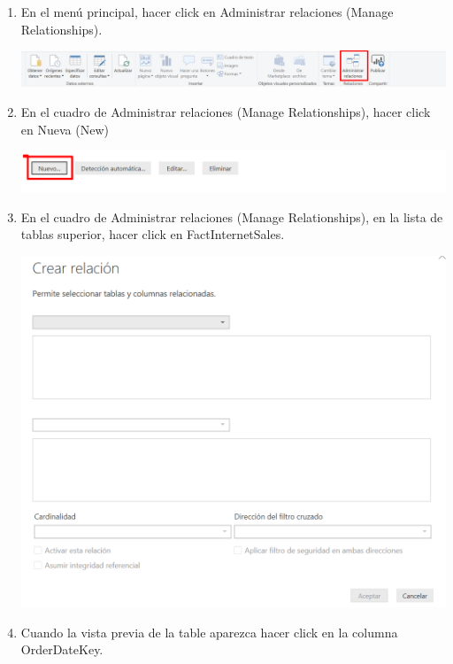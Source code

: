 \begin{itemize}
\begin{enumerate}
\item En el menú principal, hacer click en Administrar relaciones (Manage Relationships).

\begin{center}
\includegraphics[scale=0.55]{./Imagenes/17.png}
\end{center}

\item En el cuadro de Administrar relaciones (Manage Relationships), hacer click en Nueva (New)

\begin{center}
\includegraphics[scale=0.55]{./Imagenes/new.png}
\end{center}


\item En el cuadro de Administrar relaciones (Manage Relationships), en la lista de tablas superior, hacer click en FactInternetSales. 

\begin{center}
\includegraphics[scale=0.55]{./Imagenes/9.png}
\end{center}

\item Cuando la vista previa de la table aparezca hacer click en la columna OrderDateKey.


\end{enumerate}
\end{itemize}
